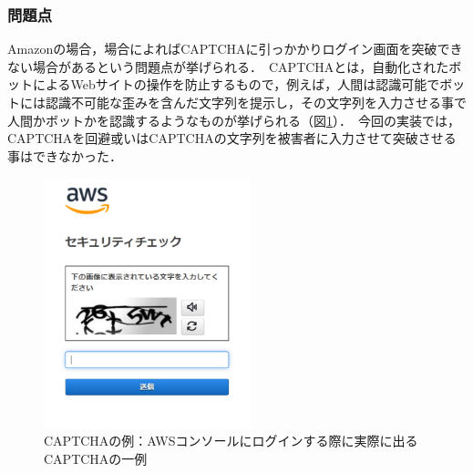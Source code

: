 \documentclass[dvipdfmx,twocolumn]{jsarticle}
\begin{document}
            \subsubsection{問題点}
                Amazonの場合，場合によればCAPTCHAに引っかかりログイン画面を突破できない場合があるという問題点が挙げられる．\
                CAPTCHAとは，自動化されたボットによるWebサイトの操作を防止するもので，例えば，人間は認識可能でボットには認識不可能な歪みを含んだ文字列を提示し，その文字列を入力させる事で人間かボットかを認識するようなものが挙げられる（図\ref{captcha}）．\
                今回の実装では，CAPTCHAを回避或いはCAPTCHAの文字列を被害者に入力させて突破させる事はできなかった．\
                \begin{figure}[h]
                    \centering
                    \includegraphics[width=6cm]{img/captcha.png}
                    \caption{CAPTCHAの例：AWSコンソールにログインする際に実際に出るCAPTCHAの一例}
                    \label{captcha}
                \end{figure}
\end{document}
